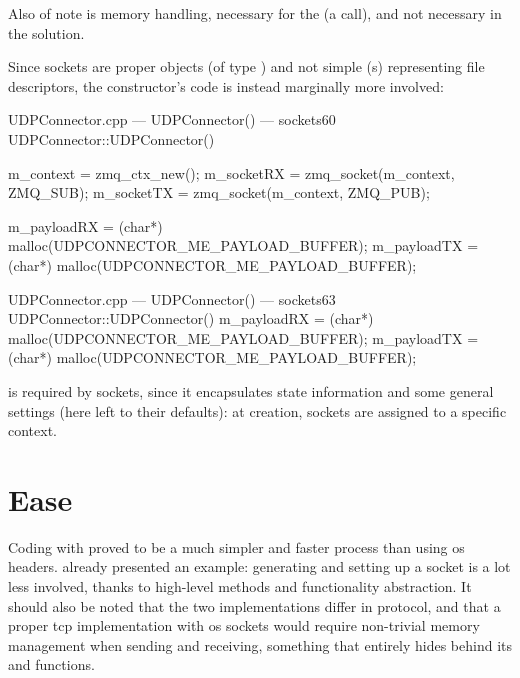 \FLOATnoindent Also of note is memory handling, necessary for the   (a  call), and not necessary in the  solution.

Since  sockets are proper  objects (of type ) and not simple (s) representing file descriptors, the constructor's code is instead marginally more involved:

\begin{codelist}{UDPConnector.cpp --- UDPConnector() ---  sockets}{60}
UDPConnector::UDPConnector() {
	m_context  = zmq_ctx_new();
	m_socketRX = zmq_socket(m_context, ZMQ_SUB);
	m_socketTX = zmq_socket(m_context, ZMQ_PUB);

	m_payloadRX = (char*) malloc(UDPCONNECTOR_ME_PAYLOAD_BUFFER);
	m_payloadTX = (char*) malloc(UDPCONNECTOR_ME_PAYLOAD_BUFFER);
}
\end{codelist}

\begin{codelist}{UDPConnector.cpp --- UDPConnector() ---  sockets}{63}
UDPConnector::UDPConnector() {
	m_payloadRX = (char*) malloc(UDPCONNECTOR_ME_PAYLOAD_BUFFER);
	m_payloadTX = (char*) malloc(UDPCONNECTOR_ME_PAYLOAD_BUFFER);
}
\end{codelist} %

\FLOATnoindent {} is required by  sockets, since it encapsulates state information and some general settings (here left to their defaults): at creation, sockets are assigned to a specific context.

\section{Ease}\label{sc:code:ease}

Coding with  proved to be a much simpler and faster process than using \gls{os} headers.  already presented an example: generating and setting up a socket is a lot less involved, thanks to high-level methods and functionality abstraction. It should also be noted that the two implementations differ in protocol, and that a proper \gls{tcp} implementation with \gls{os} sockets would require non-trivial memory management when sending and receiving, something that  entirely hides behind its  and  functions.

